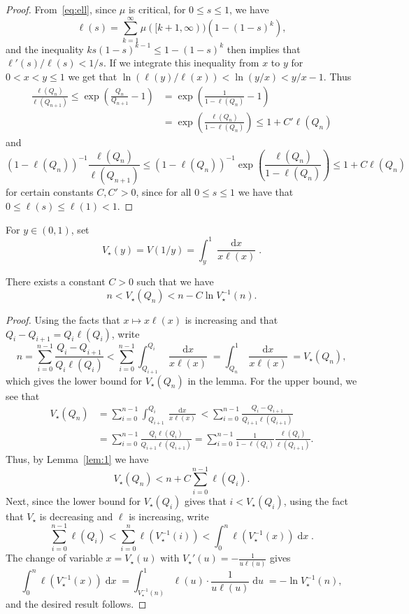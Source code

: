 \documentclass[AHL,Unicode,longabstracts,published]{cedram}
\DeclareMathOperator{\dxseq}{d\mathit{x}}
\DeclareMathOperator{\duseq}{d\mathit{u}}
\begin{document}
\begin{proof}
From~\eqref{eq:ell}, since $\mu$ is critical, for $0 \leq s \leq 1$, we have
\[
\ell(s)=\sum_{k=1}^{\infty} \mu([k+1,\infty)) \left(1-(1-s)^{k}\right),
\]
and the inequality $k s (1-s)^{k-1} \leq 1-(1-s)^{k}$ then implies that $\ell'(s)/\ell(s) < 1/s$. If we integrate this inequality from $x$ to $y$ for $0<x<y \leq 1$ we get that $ \ln ({\ell(y)}/{\ell(x)}) < \ln({y}/{x}) < y/x-1$. Thus
\begin{align*}
\frac{\ell(Q_{n})}{\ell(Q_{n+1})} \leq \exp \left(\frac{Q_{n}}{Q_{n+1}}-1\right)&= \exp \left(\frac{1}{1-\ell(Q_{n})}-1 \right)\\
&= \exp \left(\frac{\ell(Q_{n})}{1-\ell(Q_{n})} \right) \leq 1+C' \ell(Q_{n})
\end{align*}
and
\[
(1-\ell(Q_{n}))^{-1} \frac{\ell(Q_{n})}{\ell(Q_{n+1})} \leq (1-\ell(Q_{n}))^{-1} \exp \left(\frac{\ell(Q_{n})}{1-\ell(Q_{n})} \right) \leq 1+C \ell(Q_{n})
\]
for certain constants $C,C'>0$, since for all $0\leq s\leq 1$ we have that $0\leq \ell(s) \leq \ell(1) <1$.
\end{proof}

For $ y \in (0,1)$, set
\[
V_{\star}(y)=V(1/y)=\int_{y}^{1} \frac{\dxseq}{x \ell(x)}.
\]


\begin{lemm}\label{lem:2}
There exists a constant $C>0$ such that we have
\[
n < V_{\star}(Q_{n}) < n - C \ln V_{\star}^{-1}(n).
\]
\end{lemm}

\begin{proof}
Using the facts that $x \mapsto x \ell(x)$ is increasing and that $Q_{i}-Q_{i+1}=Q_i\ell(Q_i)$, write
\begin{equation*}\label{eq:lower_bound_W}
n= \sum_{i=0}^{n-1} \frac{Q_{i}-Q_{i+1}}{Q_{i} \ell(Q_{i})}< \sum_{i=0}^{n-1} \int_{Q_{i+1}}^{Q_{i}} \frac{\dxseq}{x \ell(x)}=\int_{Q_{n}}^{1} \frac{\dxseq}{x \ell(x)}=V_{\star}(Q_n),
\end{equation*}
which gives the lower bound for $V_{\star}(Q_n)$ in the lemma. For the upper bound, we see that
\begin{align*}
V_{\star}(Q_n) &=\sum_{i=0}^{n-1} \int_{Q_{i+1}}^{Q_{i}} \frac{\dxseq}{x \ell(x)} < \sum_{i=0}^{n-1} \frac{Q_{i}-Q_{i+1}}{Q_{i+1} \ell(Q_{i+1})}\\
&= \sum_{i=0}^{n-1} \frac{Q_{i}\ell(Q_i)}{Q_{i+1} \ell(Q_{i+1})}= \sum_{i=0}^{n-1} \frac{1}{1-\ell(Q_{i})} \frac{\ell(Q_i)}{\ell(Q_{i+1})}.
\end{align*}
Thus, by Lemma~\ref{lem:1} we have
\[
V_{\star}(Q_{n}) < n +C \sum_{i=0}^{n-1} \ell(Q_{i}).
\]
Next, since the lower bound for $V_{\star}(Q_i)$ gives that $i<V_{\star}(Q_{i})$, using the fact that $V_{\star}$ is decreasing and $\ell$ is increasing, write
\[
\sum_{i=0}^{n-1} \ell(Q_{i}) < \sum_{i=0}^{n} \ell \left(V_{\star}^{-1}(i)\right) < \int_{0} ^{n} \ell\left(V_{\star}^{-1}(x)\right) \dxseq.
\]
The change of variable $x=V_{\star}(u)$ with $V_{\star}'(u)= - \frac{1}{u \ell (u)}$ gives
\[
\int_{0} ^{n} \ell\left(V_{\star}^{-1}(x)\right) \dxseq= \int_{V_{\star}^{-1}(n)}^{1} \ell(u) \cdot \frac{1}{u \ell (u)} \duseq= - \ln V_{\star}^{-1}(n),
\]
and the desired result follows.
\end{proof}
\end{document}
